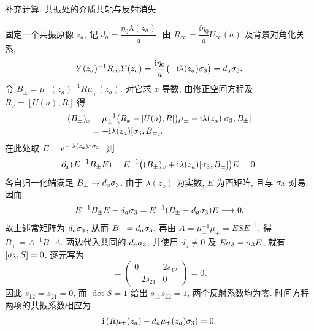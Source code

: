 \par\medskip\noindent 补充计算: 共振处的介质共轭与反射消失\par
固定一个共振原像 $z_a$, 记 $d_a=\dfrac{\eta_0\lambda(z_a)}{a}$.
由 $R_\infty=\dfrac{\ii\eta_0}{a}U_\infty(a)$ 及背景对角化关系,
\begin{equation*}
Y(z_a)^{-1}R_\infty Y(z_a)
=\dfrac{\mathrm{i}\eta_0}{a}\bigl(-\mathrm{i}\lambda(z_a)\sigma_3\bigr)
=d_a\sigma_3.
\end{equation*}
令 $B_\pm=\mu_\pm(z_a)^{-1}R\mu_\pm(z_a)$.
对它求 $x$ 导数, 由修正空间方程及 $R_x=[U(a),R]$ 得
\begin{align*}
(B_\pm)_x
&=\mu_\pm^{-1}\bigl(R_x-[U(a),R]\bigr)\mu_\pm
-\mathrm{i}\lambda(z_a)[\sigma_3,B_\pm]\\
&=-\mathrm{i}\lambda(z_a)[\sigma_3,B_\pm].
\end{align*}
在此处取 $E=e^{-\mathrm{i}\lambda(z_a)x\sigma_3}$, 则
\begin{equation*}
\partial_x(E^{-1}B_\pm E)
=E^{-1}\bigl((B_\pm)_x+\mathrm{i}\lambda(z_a)[\sigma_3,B_\pm]\bigr)E=0.
\end{equation*}
各自归一化端满足 $B_\pm\to d_a\sigma_3$.
由于 $\lambda(z_a)$ 为实数, $E$ 为酉矩阵, 且与 $\sigma_3$ 对易, 因而
\begin{equation*}
E^{-1}B_\pm E-d_a\sigma_3
=E^{-1}(B_\pm-d_a\sigma_3)E\longrightarrow0.
\end{equation*}
故上述常矩阵为 $d_a\sigma_3$, 从而 $B_\pm=d_a\sigma_3$.
再由 $A=\mu_-^{-1}\mu_+=ESE^{-1}$, 得
$B_+=A^{-1}B_-A$.
两边代入共同的 $d_a\sigma_3$, 并使用 $d_a\ne0$ 及 $E\sigma_3=\sigma_3 E$, 就有
$[\sigma_3,S]=0$. 逐元写为
\begin{equation*}
[\sg,S]=\begin{pmatrix}0&2s_{12}\\-2s_{21}&0\end{pmatrix}=0.
\end{equation*}
因此 $s_{12}=s_{21}=0$, 而 $\det S=1$ 给出 $s_{11}s_{22}=1$,
两个反射系数均为零.
时间方程两项的共振系数相应为
\begin{equation*}
\mathrm{i}\left(R\mu_\pm(z_a)-d_a\mu_\pm(z_a)\sigma_3\right)=0.
\end{equation*}

